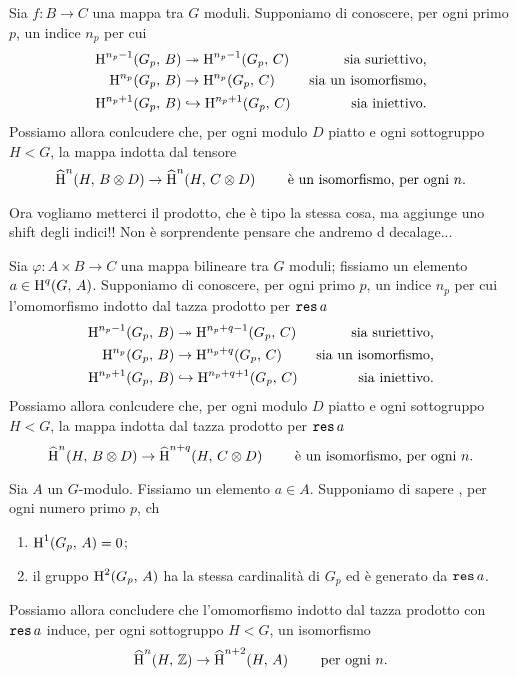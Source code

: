 \begin{proposition}
	Sia $ f \colon B \to C $ una mappa tra $ G $ moduli. Supponiamo di conoscere, per ogni primo $ p $, un indice $ n_p $ per cui
	\begin{align*}
		\operatorname{H}^{n_p-1}(G_p,\, B) &\twoheadrightarrow \operatorname{H}^{n_p-1}(G_p,\, C) & \text{ sia suriettivo,} \\
		\operatorname{H}^{n_p}(G_p,\, B) &\to \operatorname{H}^{n_p}(G_p,\, C) & \text{ sia un isomorfismo,} \\
		\operatorname{H}^{n_p+1}(G_p,\, B) &\hookrightarrow \operatorname{H}^{n_p+1}(G_p,\, C) & \text{ sia iniettivo.}
	\end{align*}
	Possiamo allora conlcudere che, per ogni modulo $ D $ piatto e ogni sottogruppo $ H < G $, la mappa indotta dal tensore
	\[ \operatorname{\widehat{H}}^n(H, \, B \otimes D) \to \operatorname{\widehat{H}}^n(H, \, C \otimes D) \qquad\text{ è un isomorfismo, per ogni } n. \]
\end{proposition}

Ora vogliamo metterci il prodotto, che è tipo la stessa cosa, ma aggiunge uno shift degli indici!! Non è sorprendente pensare che andremo d decalage...

\begin{proposition}
	Sia $ \varphi \colon A \times B \to C $ una mappa bilineare tra $ G $ moduli; fissiamo un elemento $ a \in \operatorname{H}^q(G, \, A) $. Supponiamo di conoscere, per ogni primo $ p $, un indice $ n_p $ per cui l'omomorfismo indotto dal tazza prodotto per $ \operatorname{\mathtt{res}} a $
	\begin{align*}
	\operatorname{H}^{n_p-1}(G_p,\, B) &\twoheadrightarrow \operatorname{H}^{n_p+q-1}(G_p,\, C) & \text{ sia suriettivo,} \\
	\operatorname{H}^{n_p}(G_p,\, B) &\to \operatorname{H}^{n_p+q}(G_p,\, C) & \text{ sia un isomorfismo,} \\
	\operatorname{H}^{n_p+1}(G_p,\, B) &\hookrightarrow \operatorname{H}^{n_p+q+1}(G_p,\, C) & \text{ sia iniettivo.}
	\end{align*}
	Possiamo allora conlcudere che, per ogni modulo $ D $ piatto e ogni sottogruppo $ H < G $, la mappa indotta dal tazza prodotto per $ \operatorname{\mathtt{res}} a $
	\[ \operatorname{\widehat{H}}^n(H, \, B \otimes D) \to \operatorname{\widehat{H}}^{n+q}(H, \,  C\otimes D) \qquad\text{ è un isomorfismo, per ogni } n. \]
\end{proposition}

\begin{theorem}
	Sia $ A $ un $ G $-modulo. Fissiamo un elemento $ a \in A $. Supponiamo di sapere , per ogni numero primo $ p $, ch
	\begin{enumerate}
		\item $ \operatorname{H}^1(G_p, \, A) = 0 $;
		\item il gruppo $ \operatorname{H}^2(G_p, \, A) $ ha la stessa cardinalità di $ G_p $ ed è generato da $ \operatorname{\mathtt{res}} a $.
	\end{enumerate}
	Possiamo allora concludere che l'omomorfismo indotto dal tazza prodotto con $ \operatorname{\mathtt{res}} a $ induce, per ogni sottogruppo $ H < G $, un isomorfismo
	\[ \operatorname{\widehat{H}}^n(H, \, \mathbb{Z}) \to \operatorname{\widehat{H}}^{n+2}(H, \,  A) \qquad \text{ per ogni } n.\]
\end{theorem}


